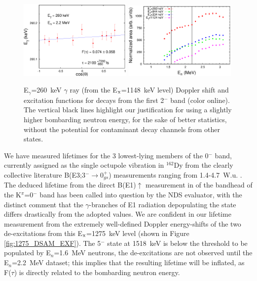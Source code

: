 \begin{figure}[h!]
\begin{center}
\includegraphics[width=0.49\textwidth]{260_DSAM.eps}
\includegraphics[width=0.49\textwidth]{260_ExF.eps}
\caption{E$_\gamma$=260~keV $\gamma$ ray (from the E$_{\rm x}$=1148~keV level) Doppler shift and excitation functions for decays from the first 2$^-$ band (color online). The vertical black lines highlight our justification for using a slightly higher bombarding neutron energy, for the sake of better statistics, without the potential for contaminant decay channels from other states. \label{fig:260_DSAM_EXF}}
\end{center}
\end{figure}

We have measured lifetimes for the 3 lowest-lying members of the 0$^-$ band, currently assigned as the single octupole vibration in $^{162}$Dy from the clearly collective literature B(E3;3$^-\rightarrow$0$^+_{gs}$) measurements ranging from 1.4-4.7~W.u. \cite{KORTEN_1993,OEHLBERG_BE3}. The deduced lifetime from the direct B(E1)$\uparrow$ measurement in \cite{Zilges_K0dipole} of the bandhead of the K$^\pi$=0$^-$ band has been called into question by the NDS evaluator, with the distinct comment that the $\gamma$-branches of E1 radiation depopulating the state differs drastically from the adopted values. We are confident in our lifetime measurement from the extremely well-defined Doppler energy-shifts of the two de-excitations from this E$_{\rm x}$=1275~keV level (shown in Figure \ref{fig:1275_DSAM_EXF}). The 5$^-$ state at 1518~keV is below the threshold to be populated by E$_n$=1.6~MeV neutrons, the de-excitations are not observed until the E$_n$=2.2~MeV dataset; this implies that the resulting lifetime will be inflated, as F($\tau$) is directly related to the bombarding neutron energy.


